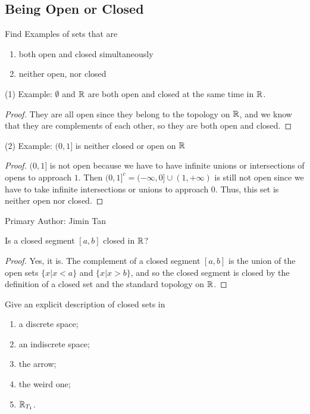 \subsection{Being Open or Closed}
\begin{majorEx} %
  Find Examples of sets that are 
  \begin{enumerate}
  \item both open and closed simultaneously
  \item neither open, nor closed
  \end{enumerate}
\end{majorEx}

(1) Example: $\emptyset$ and $\mathbb{R}$ are both open and closed at the same time in $\mathbb{R}$.
\begin{proof}
They are all open since they belong to the topology on $\mathbb{R}$, and we know that they are complements of each other, so they are both open and closed.
\end{proof}

(2) Example: $(0, 1]$ is neither closed or open on $\mathbb{R}$
\begin{proof}
$(0, 1]$ is not open because we have to have infinite unions or intersections of opens to approach $1$. Then $(0, 1]^c = (-\infty, 0] \cup (1, +\infty)$ is still not open since we have to take infinite intersections or unions to approach $0$. Thus, this set is neither open nor closed.
\end{proof}

Primary Author: Jimin Tan

\begin{majorEx} %
Is a closed segment $[a, b]$ closed in $\mathbb{R}$?
\end{majorEx}

\begin{proof}
Yes, it is. The complement of a closed segment $[a, b]$ is the union of the open
sets $\{x | x < a\}$ and $\{x | x > b\}$, and so the closed segment is closed by
the definition of a closed set and the standard topology on $\mathbb{R}$.
\end{proof}

\begin{minorEx}
    Give an explicit description of closed sets in
    \begin{enumerate}
        \item a discrete space;
        \item an indiscrete space;
        \item the arrow;
        \item the weird one;
        \item $\mathbb{R}_{T_1}$.
    \end{enumerate}
\end{minorEx}

